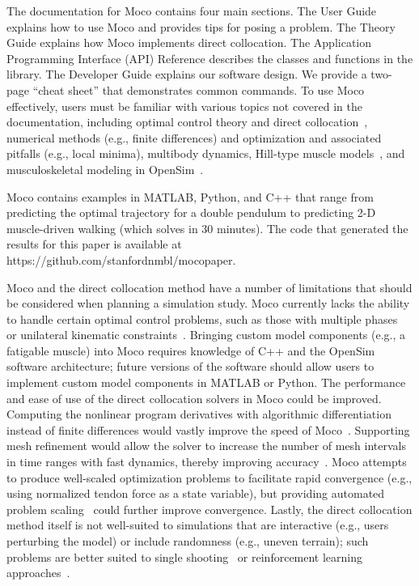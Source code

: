 \documentclass[10pt,letterpaper]{article}
\begin{document}
The documentation for Moco contains four main sections. The User Guide explains how to use Moco and provides tips for posing a problem. The Theory Guide explains how Moco implements direct collocation. The Application Programming Interface (API) Reference describes the classes and functions in the library. The Developer Guide explains our software design. We provide a two-page ``cheat sheet'' that demonstrates common commands. To use Moco effectively, users must be familiar with various topics not covered in the documentation, including optimal control theory and direct collocation~\cite{Betts:2010}, numerical methods (e.g., finite differences) and optimization and associated pitfalls (e.g., local minima), multibody dynamics, Hill-type muscle models~\cite{Groote:2016dq}, and musculoskeletal modeling in OpenSim~\cite{Seth:2018gg}.

Moco contains examples in MATLAB, Python, and C++ that range from predicting the optimal trajectory for a double pendulum to predicting 2-D muscle-driven walking (which solves in 30 minutes). The code that generated the results for this paper is available at https://github.com/stanfordnmbl/mocopaper.

Moco and the direct collocation method have a number of limitations that should be considered when planning a simulation study. Moco currently lacks the ability to handle certain optimal control problems, such as those with multiple phases~\cite{Falisse:2017} or unilateral kinematic constraints~\cite{Patel:2019}. Bringing custom model components (e.g., a fatigable muscle) into Moco requires knowledge of C++ and the OpenSim software architecture; future versions of the software should allow users to implement custom model components in MATLAB or Python. The performance and ease of use of the direct collocation solvers in Moco could be improved. Computing the nonlinear program derivatives with algorithmic differentiation instead of finite differences would vastly improve the speed of Moco~\cite{Falisse:2019a}. Supporting mesh refinement would allow the solver to increase the number of mesh intervals in time ranges with fast dynamics, thereby improving accuracy~\cite{Betts:2010}. Moco attempts to produce well-scaled optimization problems to facilitate rapid convergence (e.g., using normalized tendon force as a state variable), but providing automated problem scaling~\cite{Betts:2010} could further improve convergence. Lastly, the direct collocation method itself is not well-suited to simulations that are interactive (e.g., users perturbing the model) or include randomness (e.g., uneven terrain); such problems are better suited to single shooting~\cite{Ong:2019} or reinforcement learning approaches~\cite{Kidzinski:2019}.
\end{document}
